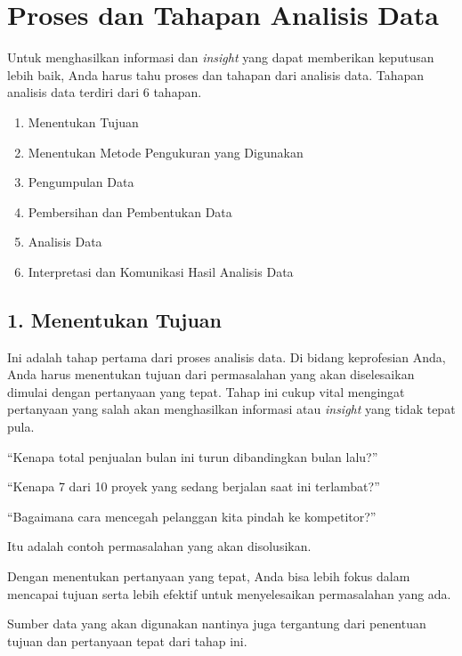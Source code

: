 \documentclass[openany]{book}
\providecommand{\tightlist}{%
  \setlength{\itemsep}{0pt}\setlength{\parskip}{0pt}}
\begin{document}
\section*{Proses dan Tahapan Analisis
Data}\label{proses-dan-tahapan-analisis-data}

Untuk menghasilkan informasi dan \emph{insight} yang dapat memberikan
keputusan lebih baik, Anda harus tahu proses dan tahapan dari analisis
data. Tahapan analisis data terdiri dari 6 tahapan.

\begin{enumerate}
\def\labelenumi{\arabic{enumi}.}
\tightlist
\item
  Menentukan Tujuan
\item
  Menentukan Metode Pengukuran yang Digunakan
\item
  Pengumpulan Data
\item
  Pembersihan dan Pembentukan Data
\item
  Analisis Data
\item
  Interpretasi dan Komunikasi Hasil Analisis Data
\end{enumerate}

\subsection*{1. Menentukan Tujuan}\label{menentukan-tujuan}

Ini adalah tahap pertama dari proses analisis data. Di bidang
keprofesian Anda, Anda harus menentukan tujuan dari permasalahan yang
akan diselesaikan dimulai dengan pertanyaan yang tepat. Tahap ini cukup
vital mengingat pertanyaan yang salah akan menghasilkan informasi atau
\emph{insight} yang tidak tepat pula.

``Kenapa total penjualan bulan ini turun dibandingkan bulan lalu?''

``Kenapa 7 dari 10 proyek yang sedang berjalan saat ini terlambat?''

``Bagaimana cara mencegah pelanggan kita pindah ke kompetitor?''

Itu adalah contoh permasalahan yang akan disolusikan.

Dengan menentukan pertanyaan yang tepat, Anda bisa lebih fokus dalam
mencapai tujuan serta lebih efektif untuk menyelesaikan permasalahan
yang ada.

Sumber data yang akan digunakan nantinya juga tergantung dari penentuan
tujuan dan pertanyaan tepat dari tahap ini.
\end{document}
